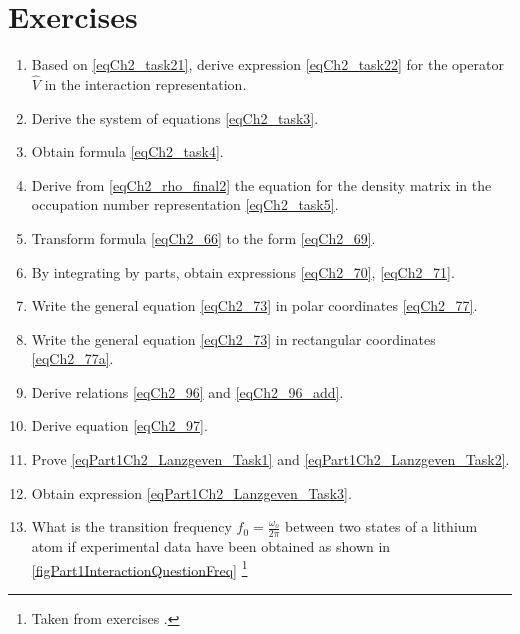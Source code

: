 \section{Exercises}
\begin{enumerate}
\item Based on \eqref{eqCh2_task21}, derive expression
  \eqref{eqCh2_task22} for the operator $\hat{V}$ in the interaction representation.
\item Derive the system of equations \eqref{eqCh2_task3}.
\item Obtain formula \eqref{eqCh2_task4}.
\item Derive from \eqref{eqCh2_rho_final2} the equation for the density matrix in the occupation number representation \eqref{eqCh2_task5}.
\item Transform formula \eqref{eqCh2_66} to the form \eqref{eqCh2_69}.
\item By integrating by parts, obtain expressions \eqref{eqCh2_70}, \eqref{eqCh2_71}.
\item Write the general equation \eqref{eqCh2_73} in polar coordinates \eqref{eqCh2_77}.
\item Write the general equation \eqref{eqCh2_73} in rectangular coordinates \eqref{eqCh2_77a}.
\item Derive relations \eqref{eqCh2_96} and \eqref{eqCh2_96_add}.
\item Derive equation \eqref{eqCh2_97}.
\item Prove \eqref{eqPart1Ch2_Lanzgeven_Task1} and \eqref{eqPart1Ch2_Lanzgeven_Task2}.
\item Obtain expression \eqref{eqPart1Ch2_Lanzgeven_Task3}.
\item \label{qInteractionFreq} What is the transition frequency $f_0 = \frac{\omega_o}{2 \pi}$ between two states of a lithium atom if experimental data have been obtained as shown in \autoref{figPart1InteractionQuestionFreq} \footnote{Taken from exercises \cite{courseIntroQuantumOpticsCoursera}.}
\end{enumerate}

 